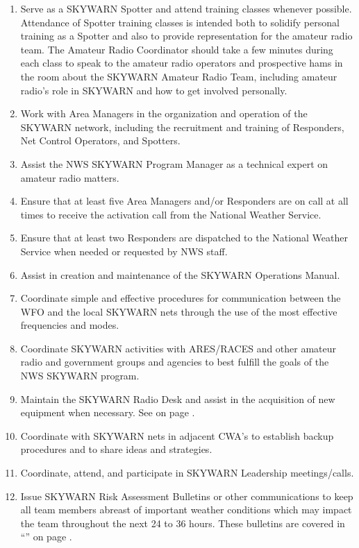 \documentclass[pdflatex,letterpaper,twoside,12pt]{book}
\begin{document}
\begin{enumerate}
\item Serve as a SKYWARN Spotter and attend training classes whenever possible.  Attendance of Spotter training classes is intended both to solidify personal training as a Spotter and also to provide representation for the amateur radio team.  The Amateur Radio Coordinator should take a few minutes during each class to speak to the amateur radio operators and prospective hams in the room about the SKYWARN Amateur Radio Team, including amateur radio's role in SKYWARN and how to get involved personally.
\item Work with Area Managers in the organization and operation of the SKYWARN network, including the recruitment and training of Responders, Net Control Operators, and Spotters.
\item Assist the NWS SKYWARN Program Manager as a technical expert on amateur radio matters.
\item Ensure that at least five Area Managers and/or Responders are on call at all times to receive the activation call from the National Weather Service.
\item Ensure that at least two Responders are dispatched to the National Weather Service when needed or requested by NWS staff.
\item Assist in creation and maintenance of the SKYWARN Operations Manual.
\item Coordinate simple and effective procedures for communication between the WFO and the local SKYWARN nets through the use of the most effective frequencies and modes.
\item Coordinate SKYWARN activities with ARES/RACES and other amateur radio and government groups and agencies to best fulfill the goals of the NWS SKYWARN program.
\item Maintain the SKYWARN Radio Desk and assist in the acquisition of new equipment when necessary.  See  on page \pageref{wx4akq-maint}.
\item Coordinate with SKYWARN nets in adjacent CWA's to establish backup procedures and to share ideas and strategies.
\item Coordinate, attend, and participate in SKYWARN Leadership meetings/calls.
\item Issue SKYWARN Risk Assessment Bulletins or other communications to keep all team members abreast of important weather conditions which may impact the team throughout the next 24 to 36 hours.  These bulletins are covered in ``'' on page \pageref{risk-assessments}.
\end{enumerate}
\end{document}
